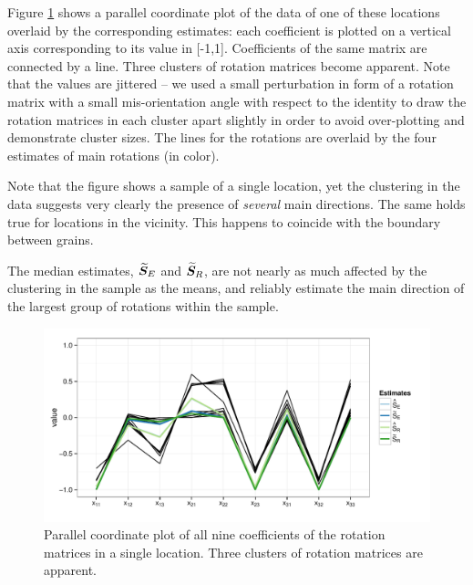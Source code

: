 {Figure \ref{fig:pcp} shows a parallel coordinate plot of the data of one of these locations overlaid by the corresponding estimates: each coefficient is plotted on a vertical axis corresponding to its value in [-1,1]. Coefficients of the same matrix are connected by a line. Three clusters of rotation matrices become apparent. Note that the values are jittered -- we used a small perturbation in form of a rotation matrix with a small mis-orientation angle with respect to the identity to draw the rotation matrices in each cluster apart slightly in order to avoid over-plotting and demonstrate cluster sizes. The lines for the rotations are overlaid by the four estimates of main rotations (in color).

 Note that the figure shows a sample of a single location, yet the clustering in the data suggests very clearly the presence of \emph{several} main directions. The same holds true for locations in the vicinity. This happens to coincide with the boundary between grains. 

The  median estimates, ${\widetilde{\bm S}_E}$  and ${\widetilde{\bm S}_R}$, are not nearly as much affected by the clustering in the sample as the means, and reliably estimate the main direction of the largest group of rotations within the sample.


\begin{figure}[htbp] %
   \centering
   \includegraphics[width=.6\textwidth]{images/pcp.pdf} 
   \caption{ \label{fig:pcp}Parallel coordinate plot of all nine coefficients of the rotation matrices in a single location. Three clusters of rotation matrices are apparent.  }
\end{figure}

}

